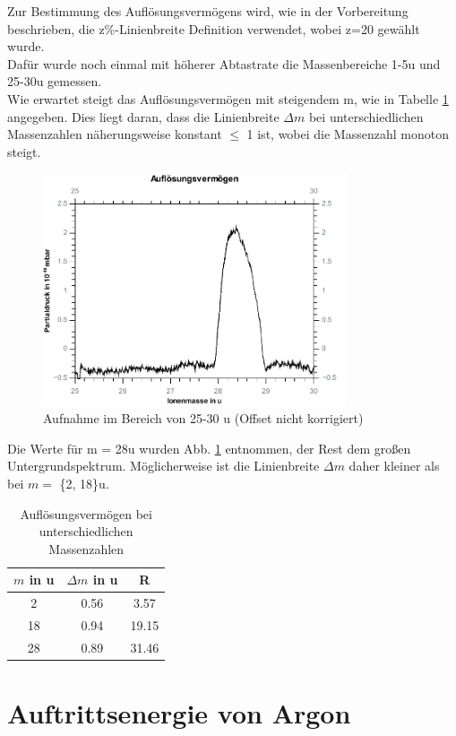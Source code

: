 Zur Bestimmung des Auflösungsvermögens wird, wie in der Vorbereitung beschrieben, die z\%-Linienbreite Definition verwendet, wobei z=20 gewählt wurde.\\
Dafür wurde noch einmal mit höherer Abtastrate die Massenbereiche 1-5\;u und 25-30\;u gemessen.\\
Wie erwartet steigt das Auflösungsvermögen mit steigendem m, wie in Tabelle \ref{tab:a1_m} angegeben. Dies liegt daran, dass die Linienbreite $\Delta m$ bei unterschiedlichen Massenzahlen näherungsweise konstant $\leq$ 1 ist, wobei die Massenzahl monoton steigt.\\
\begin{figure}[h]
	\centering\includegraphics[width=0.8\textwidth]{fig/aufloesung}
	\caption{Aufnahme im Bereich von 25-30 u (Offset nicht korrigiert)}
	\label{fig:aufloesung}
\end{figure}
Die Werte für m = 28\;u wurden Abb. \ref{fig:aufloesung} entnommen, der Rest dem großen Untergrundspektrum. Möglicherweise ist die Linienbreite $\Delta m$ daher kleiner als bei $m =$ \{2, 18\}\;u.
\begin{table}
	\centering
	\caption{Auflösungsvermögen bei unterschiedlichen Massenzahlen}
	\begin{tabular}{ccc}
		\toprule
		$m$ in u&$\Delta m$ in u&R\\
		\midrule
		2&0.56&3.57\\
		18&0.94&19.15\\
		28&0.89&31.46\\
		\bottomrule
	\end{tabular}
	\label{tab:a1_m}
\end{table}

\section{Auftrittsenergie von Argon}
\label{sec:argon}

